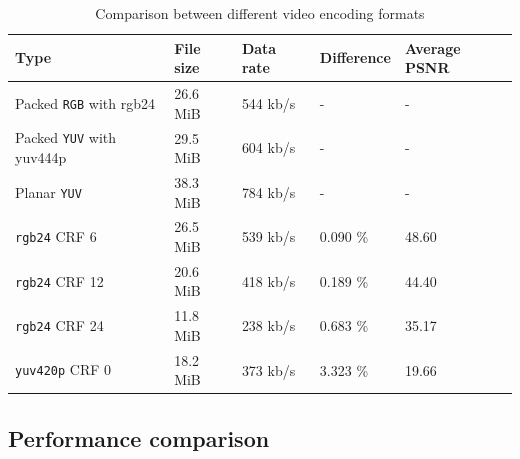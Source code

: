 \begin{table}[t]
  \centering
  \begin{tabular}{l|l|l|l|l}
    \hline
    \textbf{Type} & \textbf{File size} & \textbf{Data rate} & \textbf{Difference} & \textbf{Average PSNR} \\ \hline
    \hline
    Packed \texttt{RGB} with rgb24     & 26.6 MiB  & 544 kb/s  & -         & -         \\ \hline
    Packed \texttt{YUV} with yuv444p    & 29.5 MiB  & 604 kb/s  & -         & -         \\ \hline
    Planar \texttt{YUV}     & 38.3 MiB  & 784 kb/s  & -         & -         \\ \hline
    \hline
    \texttt{rgb24} CRF 6    & 26.5 MiB  & 539 kb/s  & 0.090 \%  & 48.60     \\ \hline
    \texttt{rgb24} CRF 12   & 20.6 MiB  & 418 kb/s  & 0.189 \%  & 44.40     \\ \hline
    \texttt{rgb24} CRF 24   & 11.8 MiB  & 238 kb/s  & 0.683 \%  & 35.17     \\ \hline
    \texttt{yuv420p} CRF 0  & 18.2 MiB  & 373 kb/s  & 3.323 \%  & 19.66     \\ \hline
  \end{tabular}
  \caption{\footnotesize Comparison between different video encoding formats}
  \label{tbl:video_format}
\end{table}

\subsection{Performance comparison}

